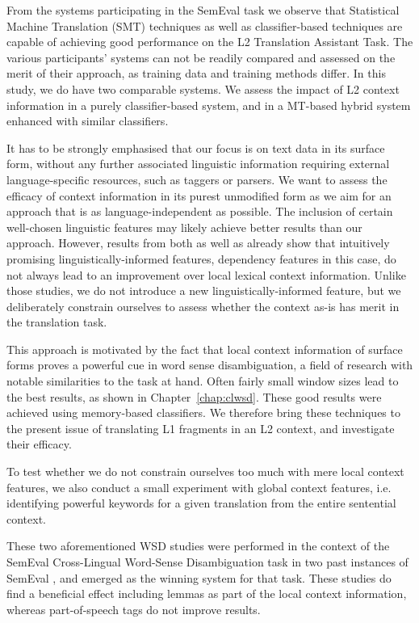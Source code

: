 From the systems participating in the SemEval task we observe that Statistical
Machine Translation (SMT) techniques as well as classifier-based techniques are
capable of achieving good performance on the L2 Translation Assistant Task. The
various participants' systems can not be readily compared and assessed on the
merit of their approach, as training data and training methods differ. In this
study, we do have two comparable systems. We assess the impact of L2 context
information in a purely classifier-based system, and in a MT-based hybrid system
enhanced with similar classifiers. 

It has to be strongly emphasised that our focus is on text data in its surface form,
without any further associated linguistic information requiring external
language-specific resources, such as taggers or parsers. We want to assess the
efficacy of context information in its purest unmodified form as we aim for an
approach that is as language-independent as possible. The inclusion of certain
well-chosen linguistic features may likely achieve better results than our
approach. However, results from both \cite{UNAL} as well as \cite{IUCL} already
show that intuitively promising linguistically-informed features, dependency
features in this case, do not always lead to an improvement over local lexical
context information. Unlike those studies, we do not introduce a new
linguistically-informed feature, but we deliberately constrain ourselves to
assess whether the context as-is has merit in the translation task.

This approach is motivated by the fact that local context information of
surface forms proves a powerful cue in word sense disambiguation, a field of
research with notable similarities to the task at hand. Often fairly small
window sizes lead to the best results, as shown in Chapter~\ref{chap:clwsd}.
These good results were achieved using memory-based classifiers. We therefore
bring these techniques to the present issue of translating L1 fragments in an
L2 context, and investigate their efficacy.

To test whether we do not constrain ourselves too much with mere local context
features, we also conduct a small experiment with global context features, i.e.
identifying powerful keywords for a given translation from the entire
sentential context.

These two aforementioned WSD studies were performed in the context of the
SemEval Cross-Lingual Word-Sense Disambiguation task in two past instances of
SemEval \citep{WSD,Lefever2013}, and emerged as the winning system for that
task. These studies do find a beneficial effect including lemmas as
part of the local context information, whereas part-of-speech tags do not
improve results. 

